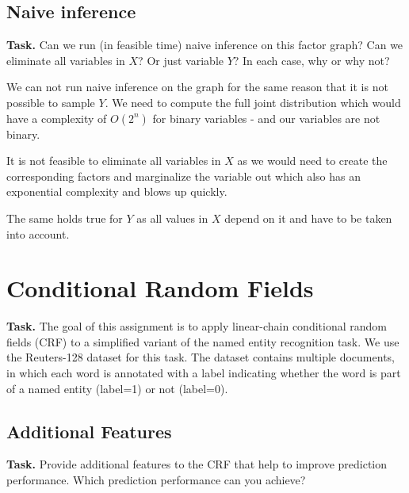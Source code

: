 \documentclass{support/acm_proc_article-sp}
\begin{document}
    \subsection{Naive inference}

    \textbf{Task.} Can we run (in feasible time) naive inference on this factor graph?
    Can we eliminate all variables in $X$?
    Or just variable $Y$?
    In each case, why or why not?

    We can not run naive inference on the graph for the same reason that it is not possible to sample $Y$.
    We need to compute the full joint distribution which would have a complexity of $O(2^n)$ for binary variables -
    and our variables are not binary.

    It is not feasible to eliminate all variables in $X$ as we would need to create the corresponding factors
    and marginalize the variable out which also has an exponential complexity and blows up quickly.

    The same holds true for $Y$ as all values in $X$ depend on it and have to be taken into account.


    \section{Conditional Random Fields}

    \textbf{Task.} The goal of this assignment is to apply linear-chain conditional random fields (CRF) to a simplified
    variant of the named entity recognition task.
    We use the Reuters-128 dataset for this task.
    The dataset contains multiple documents, in which each word is annotated with a label indicating whether the word
    is part of a named entity (label=1) or not (label=0).


    \subsection{Additional Features}

    \textbf{Task.} Provide additional features to the CRF that help to improve prediction performance.
    Which prediction performance can you achieve?
\end{document}
